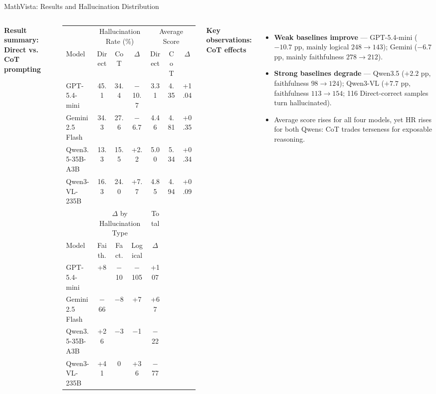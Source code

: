 \documentclass[9pt,aspectratio=169]{beamer}
\begin{document}
\begin{frame}{MathVista: Results and Hallucination Distribution}
  \begin{columns}[T,onlytextwidth]
      \textbf{\footnotesize Result summary: Direct vs. CoT prompting}

      \vspace{0.25em}
      \footnotesize
      \setlength{\tabcolsep}{3pt}
      \renewcommand{\arraystretch}{0.82}
      \begin{tabular}{l ccc ccc}
        \toprule
        & \multicolumn{3}{c}{Hallucination Rate (\%)} & \multicolumn{3}{c}{Average Score} \\
        \cmidrule(lr){2-4} \cmidrule(lr){5-7}
        Model & Direct & CoT & $\Delta$ & Direct & CoT & $\Delta$ \\
        \midrule
        GPT-5.4-mini     & 45.1 & 34.4 & \cellcolor{pink!50}$-$10.7 & 3.31 & 4.35 & +1.04 \\
        Gemini 2.5 Flash & 34.3 & 27.6 & \cellcolor{pink!50}$-$6.7  & 4.46 & 4.81 & +0.35 \\
        Qwen3.5-35B-A3B  & 13.3 & 15.5 & +2.2                         & 5.00 & 5.34 & +0.34 \\
        Qwen3-VL-235B    & 16.3 & 24.0 & +7.7                         & 4.85 & 4.94 & +0.09 \\
        \midrule
        & \multicolumn{3}{c}{$\Delta$ by Hallucination Type} & \multicolumn{1}{c}{Total} \\
        \cmidrule(lr){2-4} \cmidrule(lr){5-5}
        Model & Faith. & Fact. & Logical & $\Delta$ \\
        \midrule
        GPT-5.4-mini     & +8   & $-$10 & \cellcolor{pink!50}$-$105 & +107 \\
        Gemini 2.5 Flash & \cellcolor{pink!50}$-$66 & $-$8  & +7     & +67  \\
        Qwen3.5-35B-A3B  & +26  & $-$3  & $-$1   & $-$22 \\
        Qwen3-VL-235B    & +41  & 0     & +36    & $-$77 \\
        \bottomrule
      \end{tabular}

      \vspace{0.5em}
      \textbf{\footnotesize Key observations: CoT effects}\\[0.1em]
      \scriptsize
      \begin{itemize}\setlength{\itemsep}{0.1em}\setlength{\parskip}{0pt}
        \item \textbf{Weak baselines improve} ---
              GPT-5.4-mini ($-10.7$ pp, mainly logical $248\to143$);
              Gemini ($-6.7$ pp, mainly faithfulness $278\to212$).
        \item \textbf{Strong baselines degrade} ---
              Qwen3.5 ($+2.2$ pp, faithfulness $98\to124$);
              Qwen3-VL ($+7.7$ pp, faithfulness $113\to154$;
              116 Direct-correct samples turn hallucinated).
        \item Average score rises for all four models,
              yet HR rises for both Qwens:
              CoT trades terseness for exposable reasoning.
      \end{itemize}


\end{columns}
\end{frame}
\end{document}
